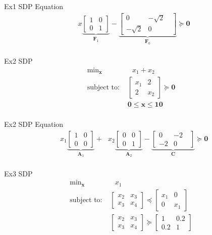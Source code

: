 \documentclass{article}
\begin{document}
Ex1 SDP Equation
\begin{align*}
    &x\underbrace{\begin{bmatrix} 1 & 0 \\ 0 & 1 \end{bmatrix}}_{\mathbf{F}_1} - \underbrace{\begin{bmatrix} 0 & -\sqrt{2}\text{ } \\ -\sqrt{2} & 0 \end{bmatrix}}_{\mathbf{F}_0} \succeq \mathbf{0}\\
\end{align*}

Ex2 SDP
\begin{align*}
    \text{min}_{\mathbf{x}}& \text{ } x_1 + x_2\\
    \mbox{subject to: }&\left[\begin{matrix} x_1 & 2 \\ 2 & x_2 \end{matrix}\right] \succeq \mathbf{0}\\
                       &\mathbf{0} \leq \mathbf{x} \leq \mathbf{10}\\
\end{align*}

Ex2 SDP Equation
\begin{align*}
    &x_1\underbrace{\begin{bmatrix} 1 & 0 \\ 0 & 0 \end{bmatrix}}_{\mathbf{A}_1} + \text{ } x_2\underbrace{\begin{bmatrix} 0 & 0 \\ 0 & 1 \end{bmatrix}}_{\mathbf{A}_2}
    -\underbrace{\begin{bmatrix} 0 & -2\text{ } \\ -2 & 0 \end{bmatrix}}_{\mathbf{C}} \succeq \mathbf{0}\\
\end{align*}

Ex3 SDP
\begin{align*}
    \text{min}_{\mathbf{x}}& \text{ } x_1\\
    \mbox{subject to: }&\begin{bmatrix} x_2 & x_3 \\ x_3 & x_4 \end{bmatrix} \preceq \begin{bmatrix} x_1 & 0 \\ 0 & x_1 \end{bmatrix}\\
                       &\begin{bmatrix} x_2 & x_3 \\ x_3 & x_4 \end{bmatrix} \succeq \begin{bmatrix} 1 & 0.2 \\ 0.2 & 1 \end{bmatrix}\\
\end{align*}
\end{document}
